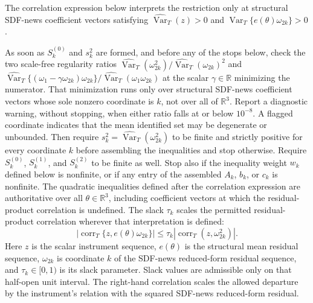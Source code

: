 \documentclass[11pt]{article}
\begin{document}
The correlation expression below interprets the restriction only at structural SDF-news coefficient
vectors satisfying
\(\widehat{\operatorname{Var}}_T(z)>0\) and
\(\widehat{\operatorname{Var}}_T\{e(\theta)\omega_{2k}\}>0\).

As soon as \(S_k^{(0)}\) and \(s_k^2\) are formed, and before any of the stops below, check the two
scale-free regularity ratios
\(\widehat{\operatorname{Var}}_T(\omega_{2k}^2)/\widehat{\operatorname{Var}}_T(\omega_{2k})^2\) and
\(\widehat{\operatorname{Var}}_T\{(\omega_1-\gamma \omega_{2k})\omega_{2k}\}/\widehat{\operatorname{Var}}_T(\omega_1\omega_{2k})\)
at the scalar \(\gamma\in\mathbb R\) minimizing the numerator. That minimization runs only over
structural SDF-news coefficient vectors whose sole nonzero coordinate is \(k\), not over all of
\(\mathbb R^3\). Report a diagnostic warning, without stopping, when either ratio falls at or
below \(10^{-8}\). A flagged coordinate indicates that the mean identified set
may be degenerate or unbounded. Then require
\(s_k^2=\widehat{\operatorname{Var}}_T(\omega_{2k}^2)\) to be finite and strictly positive for every
coordinate \(k\) before assembling the inequalities and stop otherwise. Require \(S_k^{(0)}\),
\(S_k^{(1)}\), and \(S_k^{(2)}\) to be finite as well. Stop also if the inequality weight \(w_k\)
defined below is nonfinite, or if any entry of the assembled \(A_k\), \(b_k\), or \(c_k\) is
nonfinite. The quadratic inequalities
defined after the correlation expression are authoritative over all \(\theta\in\mathbb R^3\),
including coefficient vectors at which the residual-product correlation is undefined. The slack
\(\tau_k\) scales the permitted residual-product correlation wherever that interpretation is defined:
\begin{equation}
 \left|\operatorname{corr}_T\{z,e(\theta)\omega_{2k}\}\right|
 \le \tau_k\left|\operatorname{corr}_T(z,\omega_{2k}^2)\right|.
 \label{eq:relaxed-correlation}
\end{equation}
Here \(z\) is the scalar instrument sequence, \(e(\theta)\) is the structural mean residual sequence,
\(\omega_{2k}\) is coordinate \(k\) of the SDF-news reduced-form residual sequence, and
\(\tau_k\in[0,1)\) is its slack parameter. Slack values are admissible only on that half-open unit
interval. The right-hand correlation scales the allowed departure by
the instrument's relation with the squared SDF-news reduced-form residual.
\end{document}
